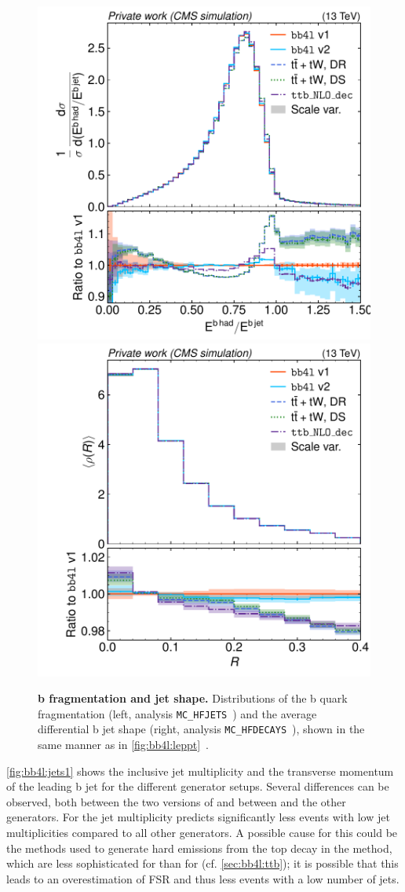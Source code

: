 \begin{figure}[tp]
    \centering
    \includegraphics[width=0.49 \textwidth]{figures/bb4l/generators/MC_HFJETS_efracB.pdf}
    \hfill
    \includegraphics[width=0.49 \textwidth]{figures/bb4l/generators/MC_HFDECAYS_avg_rho_B_jet.pdf}
    \caption{\textbf{b fragmentation and jet shape.} Distributions of the b quark fragmentation (left, \rivet analysis \texttt{MC\_HFJETS}~\cite{Rivet:2019rhm}) and the average differential b jet shape (right, \rivet analysis \texttt{MC\_HFDECAYS}~\cite{Rivet:2019rhm}), shown in the same manner as in \cref{fig:bb4l:leppt}~\cite{CMS:NOTE-2023-015}.}
    \label{fig:bb4l:jets2}
\end{figure}

\cref{fig:bb4l:jets1} shows the inclusive jet multiplicity and the transverse momentum of the leading b jet for the different generator setups. Several differences can be observed, both between the two versions of \bbfourl and between \bbfourl and the other generators. For the jet multiplicity \ttb predicts significantly less events with low jet multiplicities compared to all other generators. A possible cause for this could be the methods used to generate hard emissions from the top decay in the \powheg method, which are less sophisticated for \ttb than for \bbfourl (cf. \cref{sec:bb4l:ttb}); it is possible that this leads to an overestimation of FSR and thus less events with a low number of jets.

